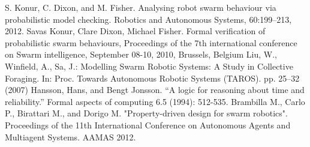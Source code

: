\documentclass[11pt]{article}
\theoremstyle{definition}
\begin{document}
\begin{thebibliography}{99}
        S. Konur, C. Dixon, and M. Fisher.
        Analysing robot swarm behaviour via probabilistic model checking.
        Robotics and Autonomous Systems, 60:199–213,
        2012.
        Savas Konur, Clare Dixon, Michael Fisher.
        Formal verification of probabilistic swarm behaviours,
        Proceedings of the 7th international conference on Swarm intelligence,
        September 08-10, 2010, Brussels, Belgium
        Liu, W., Winfield, A., Sa, J.:
        Modelling Swarm Robotic Systems: A Study in Collective Foraging.
        In: Proc. Towards Autonomous Robotic Systems (TAROS).
        pp. 25–32 (2007)
        Hansson, Hans, and Bengt Jonsson.
        ``A logic for reasoning about time and reliability.''
        Formal aspects of computing 6.5 (1994): 512-535.
        Brambilla M., Carlo P., Birattari M., and Dorigo M.
        "Property-driven design for swarm robotics".
        Proceedings of the 11th International Conference on
        Autonomous Agents and Multiagent Systems.
        AAMAS 2012.
\end{thebibliography}
\end{document}
